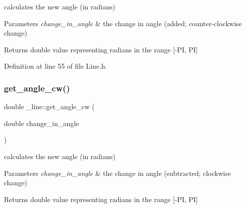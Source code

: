 calculates the new angle (in radians) 


\begin{DoxyParams}{Parameters}
{\em change\+\_\+in\+\_\+angle} & the change in angle (added; counter-\/clockwise change) \\
\hline
\end{DoxyParams}
\begin{DoxyReturn}{Returns}
double value representing radians in the range \mbox{[}-\/PI, PI\mbox{]} 
\end{DoxyReturn}


Definition at line 55 of file Line.\+h.


\begin{DoxyCode}{0}

\end{DoxyCode}
\mbox{\label{struct__line_a553d4c8e729337a21badab0c8d0f0a99}} 
\subsubsection{\texorpdfstring{get\_angle\_cw()}{get\_angle\_cw()}}
{\footnotesize\ttfamily double \+\_\+line\+::get\+\_\+angle\+\_\+cw (\begin{DoxyParamCaption}\item[{double}]{change\+\_\+in\+\_\+angle }\end{DoxyParamCaption})\hspace{0.3cm}{\ttfamily [inline]}}



calculates the new angle (in radians) 


\begin{DoxyParams}{Parameters}
{\em change\+\_\+in\+\_\+angle} & the change in angle (subtracted; clockwise change) \\
\hline
\end{DoxyParams}
\begin{DoxyReturn}{Returns}
double value representing radians in the range \mbox{[}-\/PI, PI\mbox{]} 
\end{DoxyReturn}



